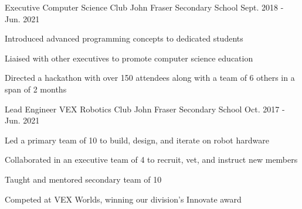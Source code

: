 

\begin{cventries}

  \cventry
    {Executive} %
    {Computer Science Club} %
    {John Fraser Secondary School} %
    {Sept. 2018 - Jun. 2021} %
    {
      \begin{cvitems} %
        \item {Introduced advanced programming concepts to dedicated students}
        \item {Liaised with other executives to promote computer science education}
        \item {Directed a hackathon with over 150 attendees along with a team of 6 others in a span of 2 months}
      \end{cvitems}
    }

  \cventry
    {Lead Engineer} %
    {VEX Robotics Club} %
    {John Fraser Secondary School} %
    {Oct. 2017 - Jun. 2021} %
    {
      \begin{cvitems} %
        \item {Led a primary team of 10 to build, design, and iterate on robot hardware}
        \item {Collaborated in an executive team of 4 to recruit, vet, and instruct new members}
        \item {Taught and mentored secondary team of 10}
        \item {Competed at VEX Worlds, winning our division's Innovate award}
      \end{cvitems}
    }

\end{cventries}
